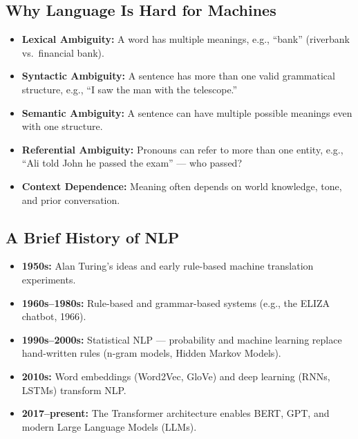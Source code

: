 \documentclass[11pt,a4paper]{article}
\begin{document}
\subsection{Why Language Is Hard for Machines}
\begin{itemize}[leftmargin=*]
  \item \textbf{Lexical Ambiguity:} A word has multiple meanings, e.g., ``bank'' (riverbank vs.\ financial bank).
  \item \textbf{Syntactic Ambiguity:} A sentence has more than one valid grammatical structure, e.g., ``I saw the man with the telescope.''
  \item \textbf{Semantic Ambiguity:} A sentence can have multiple possible meanings even with one structure.
  \item \textbf{Referential Ambiguity:} Pronouns can refer to more than one entity, e.g., ``Ali told John he passed the exam'' --- who passed?
  \item \textbf{Context Dependence:} Meaning often depends on world knowledge, tone, and prior conversation.
\end{itemize}

\subsection{A Brief History of NLP}
\begin{itemize}[leftmargin=*]
  \item \textbf{1950s:} Alan Turing's ideas and early rule-based machine translation experiments.
  \item \textbf{1960s--1980s:} Rule-based and grammar-based systems (e.g., the ELIZA chatbot, 1966).
  \item \textbf{1990s--2000s:} Statistical NLP --- probability and machine learning replace hand-written rules (n-gram models, Hidden Markov Models).
  \item \textbf{2010s:} Word embeddings (Word2Vec, GloVe) and deep learning (RNNs, LSTMs) transform NLP.
  \item \textbf{2017--present:} The Transformer architecture enables BERT, GPT, and modern Large Language Models (LLMs).
\end{itemize}
\end{document}
